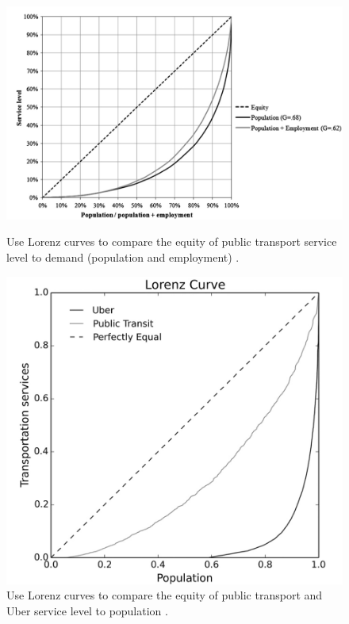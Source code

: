 \documentclass[11pt]{article}
\begin{document}
\begin{figure}[!tbp]
  \centering
  \begin{minipage}[b]{0.48\textwidth}
    \centering
    \includegraphics[width=\textwidth]{gini2.png}
    \caption{Use Lorenz curves to compare the equity of public transport service level to demand (population and employment) \cite{delbosc2011using}.}
    \label{fig:gini2}
  \end{minipage}
  \hspace{2cm}
  \begin{minipage}[b]{0.34\textwidth}
    \centering
    \includegraphics[width=\textwidth]{gini3.png}
    \caption{Use Lorenz curves to compare the equity of public transport and Uber  service level to population \cite{jin2019uber}.}
    \label{fig:gini3}
  \end{minipage}
\end{figure}
\end{document}
